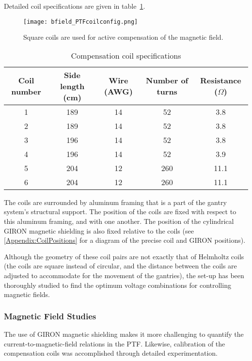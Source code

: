 Detailed coil specifications are given in table~\ref{tab:coil_specs}.
%
\begin{figure}[h]
  \begin{center}
  \texttt{[image: bfield\_PTFcoilconfig.png]}
  \caption{Square coils are used for active compensation of the magnetic field.}
  \label{fig:coils}
  \end{center}
\end{figure}
%
\begin{table}[h]
\begin{center}
  \begin{tabular}{|c|c c c c|}
    \hline
    Coil number & Side length (cm) & Wire (AWG) & Number of turns & Resistance ($\Omega$)\\
    \hline\hline
    1 & 189 & 14 & 52 & 3.8 \\
    2 & 189 & 14 & 52 & 3.8 \\
    3 & 196 & 14 & 52 & 3.8 \\
    4 & 196 & 14 & 52 & 3.9 \\
    5 & 204 & 12 & 260 & 11.1 \\
    6 & 204 & 12 & 260 & 11.1 \\
    \hline
  \end{tabular}
\end{center}
\caption{Compensation coil specifications}
\label{tab:coil_specs}
\end{table}
%

The coils are surrounded by aluminum framing that is a part of the gantry system's structural support. The position of the coils are fixed with respect to this aluminum framing, and with one another. The position of the cylindrical GIRON magnetic shielding is also fixed relative to the coils (see \ref{Appendix:CoilPositions} for a diagram of the precise coil and GIRON positions).

Although the geometry of these coil pairs are not exactly that of Helmholtz coils (the coils are square instead of circular, and the distance between the coils are adjusted to accommodate for the movement of the gantries), the set-up has been thoroughly studied to find the optimum voltage combinations for controlling magnetic fields.

\subsubsection{Magnetic Field Studies}

The use of GIRON magnetic shielding makes it more challenging to quantify the current-to-magnetic-field relations in the PTF. Likewise, calibration of the compensation coils was accomplished through detailed experimentation.

